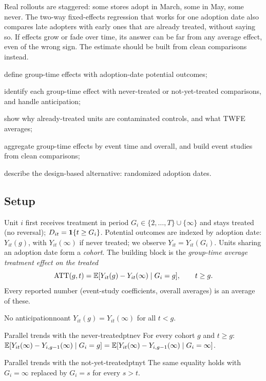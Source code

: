 \documentclass[11pt]{article}
\begin{document}

\begin{decision}
Real rollouts are staggered: some stores adopt in March, some in May, some never. The two-way fixed-effects regression that
works for one adoption date also compares late adopters with early ones that are already treated, without saying so. If effects grow or fade
over time, its answer can be far from any average effect, even of the wrong sign. The estimate should be built from clean
comparisons instead.
\end{decision}

\begin{goals}
  \item define group-time effects with adoption-date potential outcomes;
  \item identify each group-time effect with never-treated or not-yet-treated comparisons, and handle anticipation;
  \item show why already-treated units are contaminated controls, and what TWFE averages;
  \item aggregate group-time effects by event time and overall, and build event studies from clean comparisons;
  \item describe the design-based alternative: randomized adoption dates.
\end{goals}

\sectionone

\subsection{Setup}

Unit $i$ first receives treatment in period $G_i \in \{2, \dots, T\} \cup \{\infty\}$ and stays treated (no reversal); $D_{it} = \mathbf{1}\{t \ge G_i\}$. Potential
outcomes are indexed by adoption date: $Y_{it}(g)$, with $Y_{it}(\infty)$ if never treated; we observe $Y_{it} = Y_{it}(G_i)$. Units sharing an adoption
date form a \emph{cohort}. The building block is the \emph{group-time average treatment effect on the treated}
\[
  \text{ATT}(g, t) = \mathbb{E}[Y_{it}(g) - Y_{it}(\infty) \mid G_i = g], \qquad t \ge g .
\]
Every reported number (event-study coefficients, overall averages) is an average of these.

\begin{assum}{No anticipation}{noant}
$Y_{it}(g) = Y_{it}(\infty)$ for all $t < g$.
\end{assum}
\begin{assum}{Parallel trends with the never-treated}{ptnev}
For every cohort $g$ and $t \ge g$: $\mathbb{E}[Y_{it}(\infty) - Y_{i,g-1}(\infty) \mid G_i = g] = \mathbb{E}[Y_{it}(\infty) - Y_{i,g-1}(\infty) \mid G_i = \infty]$.
\end{assum}
\begin{assum}{Parallel trends with the not-yet-treated}{ptnyt}
The same equality holds with $G_i = \infty$ replaced by $G_i = s$ for every $s > t$.
\end{assum}
\end{document}
